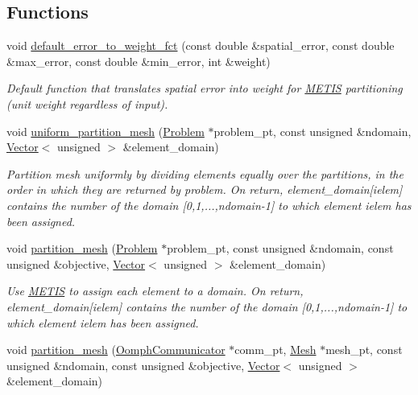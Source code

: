 \subsection*{Functions}
\begin{DoxyCompactItemize}
\item 
void \hyperlink{namespaceoomph_1_1METIS_af5633647d4ff099648151db2d7d0a1e5}{default\+\_\+error\+\_\+to\+\_\+weight\+\_\+fct} (const double \&spatial\+\_\+error, const double \&max\+\_\+error, const double \&min\+\_\+error, int \&weight)
\begin{DoxyCompactList}\small\item\em Default function that translates spatial error into weight for \hyperlink{namespaceoomph_1_1METIS}{M\+E\+T\+IS} partitioning (unit weight regardless of input). \end{DoxyCompactList}\item 
void \hyperlink{namespaceoomph_1_1METIS_a58831157b0cfadc57485c3de01df7d78}{uniform\+\_\+partition\+\_\+mesh} (\hyperlink{classoomph_1_1Problem}{Problem} $\ast$problem\+\_\+pt, const unsigned \&ndomain, \hyperlink{classoomph_1_1Vector}{Vector}$<$ unsigned $>$ \&element\+\_\+domain)
\begin{DoxyCompactList}\small\item\em Partition mesh uniformly by dividing elements equally over the partitions, in the order in which they are returned by problem. On return, element\+\_\+domain\mbox{[}ielem\mbox{]} contains the number of the domain \mbox{[}0,1,...,ndomain-\/1\mbox{]} to which element ielem has been assigned. \end{DoxyCompactList}\item 
void \hyperlink{namespaceoomph_1_1METIS_aa3c7e4be46d6148cc60f43354127fc94}{partition\+\_\+mesh} (\hyperlink{classoomph_1_1Problem}{Problem} $\ast$problem\+\_\+pt, const unsigned \&ndomain, const unsigned \&objective, \hyperlink{classoomph_1_1Vector}{Vector}$<$ unsigned $>$ \&element\+\_\+domain)
\begin{DoxyCompactList}\small\item\em Use \hyperlink{namespaceoomph_1_1METIS}{M\+E\+T\+IS} to assign each element to a domain. On return, element\+\_\+domain\mbox{[}ielem\mbox{]} contains the number of the domain \mbox{[}0,1,...,ndomain-\/1\mbox{]} to which element ielem has been assigned. \end{DoxyCompactList}\item 
void \hyperlink{namespaceoomph_1_1METIS_a7504999ec1517cc95d0393753a714fe9}{partition\+\_\+mesh} (\hyperlink{classoomph_1_1OomphCommunicator}{Oomph\+Communicator} $\ast$comm\+\_\+pt, \hyperlink{classoomph_1_1Mesh}{Mesh} $\ast$mesh\+\_\+pt, const unsigned \&ndomain, const unsigned \&objective, \hyperlink{classoomph_1_1Vector}{Vector}$<$ unsigned $>$ \&element\+\_\+domain)

\end{DoxyCompactItemize}
